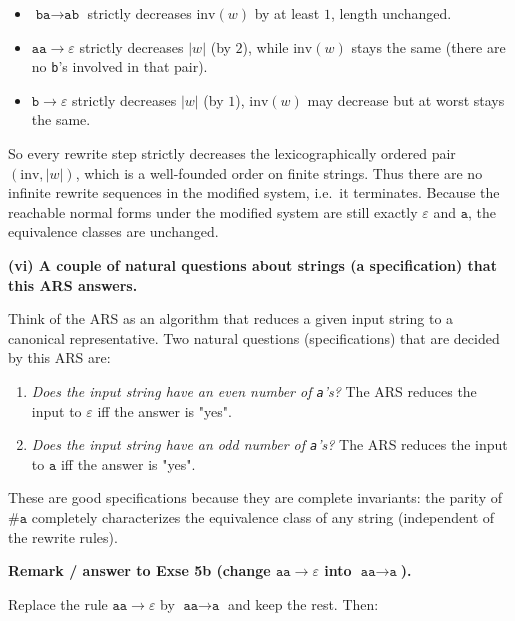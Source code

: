 \documentclass{article}
\theoremstyle{plain}
\theoremstyle{definition}
\theoremstyle{remark}
\begin{document}
\begin{itemize}
  \item \(\texttt{ba}\to\texttt{ab}\) strictly decreases \(\mathrm{inv}(w)\) by at least \(1\), length unchanged.
  \item \(\texttt{aa}\to\varepsilon\) strictly decreases \(|w|\) (by \(2\)), while \(\mathrm{inv}(w)\) stays the same (there are no \texttt{b}'s involved in that pair).
  \item \(\texttt{b}\to\varepsilon\) strictly decreases \(|w|\) (by \(1\)), \(\mathrm{inv}(w)\) may decrease but at worst stays the same.
\end{itemize}

So every rewrite step strictly decreases the lexicographically ordered pair \((\mathrm{inv},|w|)\), which is a well-founded order on finite strings. Thus there are no infinite rewrite sequences in the modified system, i.e.\ it terminates. Because the reachable normal forms under the modified system are still exactly \(\varepsilon\) and \(\texttt{a}\), the equivalence classes are unchanged.

\bigskip

\textbf{(vi) A couple of natural questions about strings (a specification) that this ARS answers.}

Think of the ARS as an algorithm that reduces a given input string to a canonical representative. Two natural questions (specifications) that are decided by this ARS are:

\begin{enumerate}
  \item \emph{Does the input string have an even number of \texttt{a}'s?}  
  The ARS reduces the input to \(\varepsilon\) iff the answer is "yes".
  \item \emph{Does the input string have an odd number of \texttt{a}'s?}  
  The ARS reduces the input to \(\texttt{a}\) iff the answer is "yes".
\end{enumerate}

These are good specifications because they are complete invariants: the parity of \(\#\texttt{a}\) completely characterizes the equivalence class of any string (independent of the rewrite rules).

\bigskip

\textbf{Remark / answer to Exse 5b (change \(\texttt{aa}\to\varepsilon\) into \(\texttt{aa}\to\texttt{a}\)).}

Replace the rule \(\texttt{aa}\to\varepsilon\) by \(\texttt{aa}\to\texttt{a}\) and keep the rest. Then:
\end{document}

